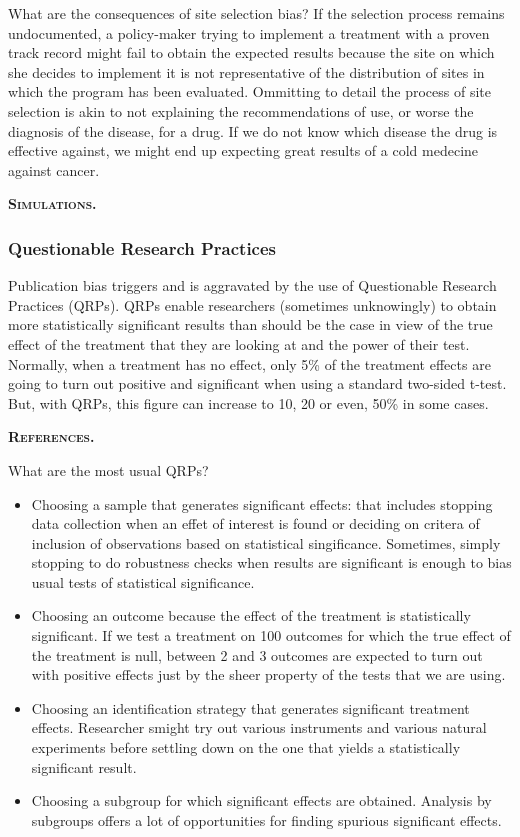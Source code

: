 \documentclass[
]{book}
\providecommand{\tightlist}{%
  \setlength{\itemsep}{0pt}\setlength{\parskip}{0pt}}
\theoremstyle{definition}
\theoremstyle{definition}
\theoremstyle{definition}
\theoremstyle{definition}
\theoremstyle{remark}
\begin{document}
What are the consequences of site selection bias?
If the selection process remains undocumented, a policy-maker trying to implement a treatment with a proven track record might fail to obtain the expected results because the site on which she decides to implement it is not representative of the distribution of sites in which the program has been evaluated.
Ommitting to detail the process of site selection is akin to not explaining the recommendations of use, or worse the diagnosis of the disease, for a drug.
If we do not know which disease the drug is effective against, we might end up expecting great results of a cold medecine against cancer.

\textbf{\textsc{Simulations.}}

\hypertarget{questionable-research-practices}{%
\subsubsection{Questionable Research Practices}\label{questionable-research-practices}}

Publication bias triggers and is aggravated by the use of Questionable Research Practices (QRPs).
QRPs enable researchers (sometimes unknowingly) to obtain more statistically significant results than should be the case in view of the true effect of the treatment that they are looking at and the power of their test.
Normally, when a treatment has no effect, only 5\% of the treatment effects are going to turn out positive and significant when using a standard two-sided t-test.
But, with QRPs, this figure can increase to 10, 20 or even, 50\% in some cases.

\textbf{\textsc{References.}}

What are the most usual QRPs?

\begin{itemize}
\tightlist
\item
  Choosing a sample that generates significant effects: that includes stopping data collection when an effet of interest is found or deciding on critera of inclusion of observations based on statistical singificance.
  Sometimes, simply stopping to do robustness checks when results are significant is enough to bias usual tests of statistical significance.
\item
  Choosing an outcome because the effect of the treatment is statistically significant.
  If we test a treatment on 100 outcomes for which the true effect of the treatment is null, between 2 and 3 outcomes are expected to turn out with positive effects just by the sheer property of the tests that we are using.
\item
  Choosing an identification strategy that generates significant treatment effects.
  Researcher smight try out various instruments and various natural experiments before settling down on the one that yields a statistically significant result.
\item
  Choosing a subgroup for which significant effects are obtained.
  Analysis by subgroups offers a lot of opportunities for finding spurious significant effects.
\end{itemize}
\end{document}
